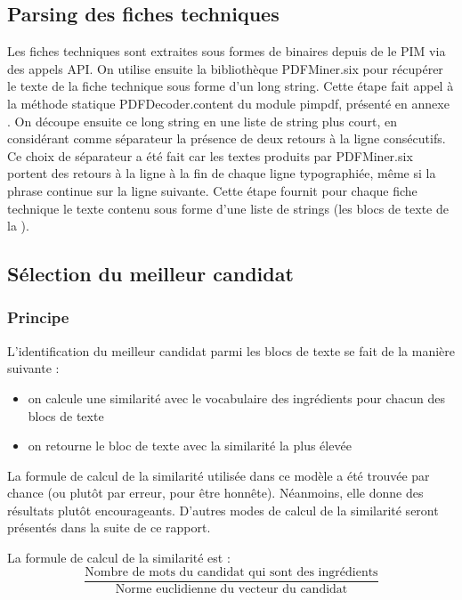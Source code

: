             \subsection{Parsing des fiches techniques}

                Les fiches techniques sont extraites sous formes de binaires depuis de le PIM via des appels API.
                On utilise ensuite la bibliothèque PDFMiner.six pour récupérer le texte de la fiche technique sous forme d'un long string.
                Cette étape fait appel à la méthode statique PDFDecoder.content du module pimpdf, présenté en annexe .
                On découpe ensuite ce long string en une liste de string plus court, en considérant comme séparateur la présence de deux retours à la ligne consécutifs.
                Ce choix de séparateur a été fait car les textes produits par PDFMiner.six portent des retours à la ligne à la fin de chaque ligne typographiée, même si la phrase continue sur la ligne suivante.
                Cette étape fournit pour chaque fiche technique le texte contenu sous forme d'une liste de strings (les blocs de texte de la ).

            \subsection{Sélection du meilleur candidat}

                \subsubsection{Principe}
                L'identification du meilleur candidat parmi les blocs de texte se fait de la manière suivante :
                \begin{itemize}
                    \item on calcule une similarité avec le vocabulaire des ingrédients pour chacun des blocs de texte
                    \item on retourne le bloc de texte avec la similarité la plus élevée
                \end{itemize}
                La formule de calcul de la similarité utilisée dans ce modèle a été trouvée par chance (ou plutôt par erreur, pour être honnête).
                Néanmoins, elle donne des résultats plutôt encourageants.
                D'autres modes de calcul de la similarité seront présentés dans la suite de ce rapport.

                La formule de calcul de la similarité est :
                \[\frac{\text{Nombre de mots du candidat qui sont des ingrédients}}{\text{Norme euclidienne du vecteur du candidat}}\]
                

